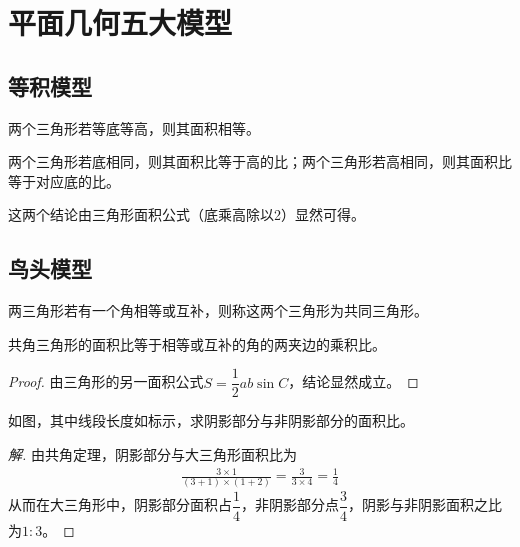 
\section{平面几何五大模型}
\label{sec:five-models-in-geometry}

\subsection{等积模型}
\label{sec:same-volumne-model}

\begin{theorem}
  两个三角形若等底等高，则其面积相等。
\end{theorem}

\begin{theorem}
  两个三角形若底相同，则其面积比等于高的比；两个三角形若高相同，则其面积比等于对应底的比。
\end{theorem}

这两个结论由三角形面积公式（底乘高除以2）显然可得。


\subsection{鸟头模型}
\label{sec:common-angle-theorem}

\begin{definition}[共角三角形]
  两三角形若有一个角相等或互补，则称这两个三角形为共同三角形。
\end{definition}

\begin{theorem}
  共角三角形的面积比等于相等或互补的角的两夹边的乘积比。
\end{theorem}
\begin{proof}
  由三角形的另一面积公式$S=\dfrac12ab\sin C$，结论显然成立。
\end{proof}

\begin{example}
  如图，其中线段长度如标示，求阴影部分与非阴影部分的面积比。

  \centering
\end{example}
\begin{proof}[解]
  由共角定理，阴影部分与大三角形面积比为
  \begin{align*}
    \frac{3\times 1}{(3+1)\times(1+2)}=\frac{3}{3\times4}=\frac14
  \end{align*}
  从而在大三角形中，阴影部分面积占$\dfrac14$，非阴影部分点$\dfrac34$，阴影与非阴影面积之比为$1:3$。
\end{proof}

